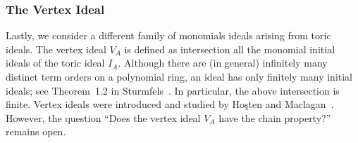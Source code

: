 \subsubsection*{The Vertex Ideal}  Lastly, we consider a different family of
monomials ideals arising from toric ideals.  The vertex
ideal $V_{A}$ is defined as intersection all the
monomial initial ideals of the toric ideal $I_{A}$.  Although there
are (in general) infinitely many distinct term orders on a polynomial
ring, an ideal has only finitely many initial ideals; see Theorem~1.2
in Sturmfels~\cite{MR97b:13034}.  In particular, the above
intersection is finite.  Vertex ideals were introduced and studied by
Ho{\c{s}}ten and Maclagan~\cite{Hosten-Maclagan}.  However, the
question ``Does the vertex ideal $V_A$ have the chain property?''
remains open.




